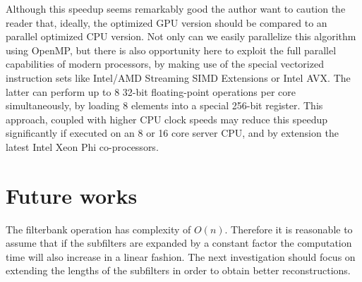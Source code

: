 \documentclass[a4paper,10pt]{article}
\begin{document}
Although this speedup seems remarkably good the author want to caution the reader that, ideally, the optimized GPU version should be compared to an parallel optimized CPU
version. Not only can we easily parallelize this algorithm using OpenMP, but there is also opportunity here to exploit the full parallel capabilities of modern processors,
by making use of the special vectorized instruction sets like Intel/AMD Streaming SIMD Extensions or Intel AVX. The latter can perform up to 8 32-bit floating-point
operations per core simultaneously, by loading 8 elements into a special 256-bit register. This approach, coupled with higher CPU clock speeds may reduce this speedup 
significantly if executed on an 8 or 16 core server CPU, and by extension the latest Intel Xeon Phi co-processors.

\section{Future works}
The filterbank operation has complexity of $O(n)$. Therefore it is reasonable to assume that if the subfilters are expanded by a constant factor the computation time will also 
increase in a linear fashion. The next investigation should focus on extending the lengths of the subfilters in order to obtain better reconstructions.
\pagebreak
{}

\end{document}
